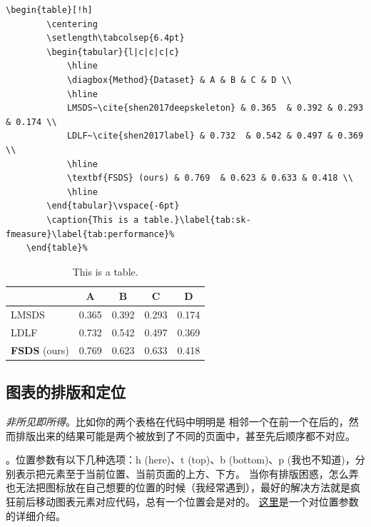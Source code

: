 \begin{lstlisting}[captionpos=b,language=Tex]
	\begin{table}[!h]
		\centering
		\setlength\tabcolsep{6.4pt}
		\begin{tabular}{l|c|c|c|c}
			\hline
			\diagbox{Method}{Dataset} & A & B & C & D \\
			\hline
			LMSDS~\cite{shen2017deepskeleton} & 0.365  & 0.392 & 0.293 & 0.174 \\
			LDLF~\cite{shen2017label} & 0.732  & 0.542 & 0.497 & 0.369 \\
			\hline
			\textbf{FSDS} (ours) & 0.769  & 0.623 & 0.633 & 0.418 \\
			\hline
		\end{tabular}\vspace{-6pt}
		\caption{This is a table.}\label{tab:sk-fmeasure}\label{tab:performance}%
	\end{table}%
\end{lstlisting}

\begin{table}[!h]
	\centering
	\setlength\tabcolsep{6.4pt}
	\begin{tabular}{l|c|c|c|c}
		\hline
		\diagbox{Method}{Dataset} & A & B & C & D \\
		\hline
		LMSDS~\cite{shen2017deepskeleton} & 0.365  & 0.392 & 0.293 & 0.174 \\
		LDLF~\cite{shen2017label} & 0.732  & 0.542 & 0.497 & 0.369 \\
		\hline
		\textbf{FSDS} (ours) & 0.769  & 0.623 & 0.633 & 0.418 \\
		\hline
	\end{tabular}\vspace{-6pt}
	\caption{This is a table.}\label{tab:sk-fmeasure}\label{tab:performance}%
\end{table}%

\subsection{图表的排版和定位}\label{sec:location}
\emph{非所见即所得}。比如你的两个表格在代码中明明是
相邻一个在前一个在后的，然而排版出来的结果可能是两个被放到了不同的页面中，甚至先后顺序都不对应。
%

。位置参数有以下几种选项：h (here)、t (top)、b (bottom)、p (我也不知道)，分别表示把元素至于当前位置、当前页面的上方、下方。
当你有排版困惑，怎么弄也无法把图标放在自己想要的位置的时候（我经常遇到），最好的解决方法就是疯狂前后移动图表元素对应代码，总有一个位置会是对的。
%
\href{https://tex.stackexchange.com/questions/35125/how-to-use-the-placement-options-t-h-with-figures}{这里}是一个对位置参数的详细介绍。
